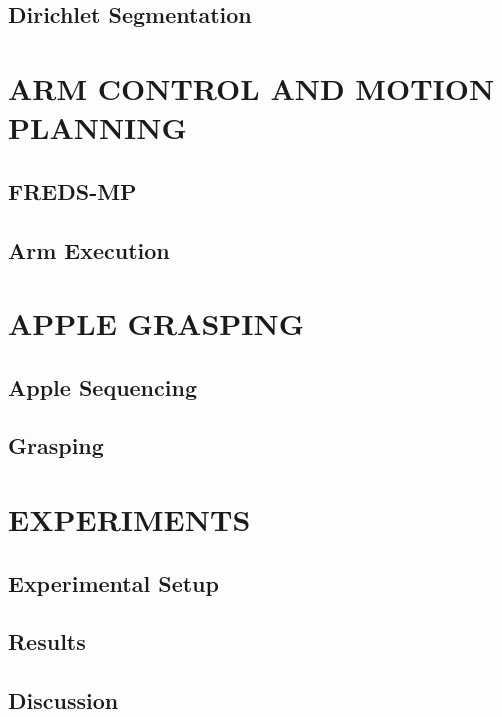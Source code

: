\documentclass[letterpaper, 10 pt, conference]{ieeeconf}  %
\theoremstyle{prop}
\begin{document}
\subsection{Dirichlet Segmentation}

\section{ARM CONTROL AND MOTION PLANNING}
\subsection{FREDS-MP}

\subsection{Arm Execution}

\section{APPLE GRASPING}
\subsection{Apple Sequencing}

\subsection{Grasping} 


\section{EXPERIMENTS}

\subsection{Experimental Setup}

\subsection{Results}

\subsection{Discussion}
\end{document}
